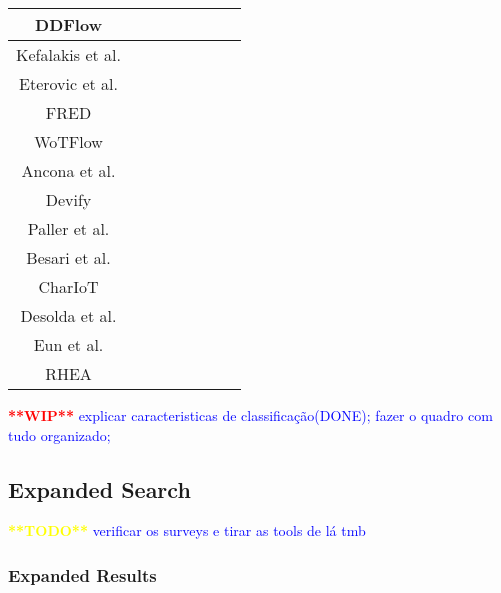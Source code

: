 \begin{table}[ht]
{\begin{tabular}{| c | c | c | c | c | c | c | c |}
        \hline
        DDFlow \cite{ddflow} &  &  &  &  &  &  &  \\
        \hline
        Kefalakis et al. \cite{visual_paradigm_iot_solutions_development} &  &  &  &  &  &  &  \\
        \hline
        Eterovic et al. \cite{vpl_uml} &  &  &  &  &  &  &  \\
        \hline
        FRED \cite{fred} &  &  &  &  &  &  &  \\
        \hline
        WoTFlow \cite{wotflow_dnr} &  &  &  &  &  &  &  \\
        \hline
        Ancona et al. \cite{runtime_monitoring} &  &  &  &  &  &  &  \\
        \hline
        Devify \cite{devify} &  &  &  &  &  &  &  \\
        \hline
        Paller et al. \cite{orcc_extension} &  &  &  &  &  &  &  \\
        \hline
        Besari et al. \cite{mobile_apps_rpi} \cite{pre_mobile_apps_rpi} &  &  &  &  &  &  &  \\
        \hline
        CharIoT \cite{chariot} &  &  &  &  &  &  &  \\
        \hline
        Desolda et al. \cite{desolda} &  &  &  &  &  &  &  \\
        \hline
        Eun et al. \cite{eud_platform} &  &  &  &  &  &  &  \\
        \hline
        RHEA \cite{rhea} &  &  &  &  &  &  &  \\
        \hline
    \end{tabular}
    }
    \label{tab:evaluation_process_results}
\end{table}{}

\textcolor{red}{\textbf{**WIP**}}
\textcolor{blue}{explicar caracteristicas de classificação(DONE); fazer o quadro com tudo organizado;}



\subsection{Expanded Search}

\textcolor{yellow}{\textbf{**TODO**}}
\textcolor{blue}{verificar os surveys e tirar as tools de lá tmb}

\subsubsection{Expanded Results}

